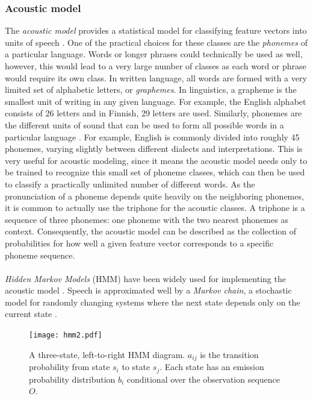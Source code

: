 \documentclass[english, 12pt, a4paper, pdftex, elec, utf8]{aaltothesis}
\begin{document}
\subsubsection{Acoustic model}

The \textit{acoustic model} provides a statistical model for classifying feature vectors into units of speech \cite{kallasjoki2016}. One of the practical choices for these classes are the \textit{phonemes} of a particular language. Words or longer phrases could technically be used as well, however, this would lead to a very large number of classes as each word or phrase would require its own class. In written language, all words are formed with a very limited set of alphabetic letters, or \textit{graphemes}. In linguistics, a grapheme is the smallest unit of writing in any given language. For example, the English alphabet consists of 26 letters and in Finnish, 29 letters are used. Similarly, phonemes are the different units of sound that can be used to form all possible words in a particular language \cite[p.~24--25]{huang2001spoken}. For example, English is commonly divided into roughly 45 phonemes, varying slightly between different dialects and interpretations. This is very useful for acoustic modeling, since it means the acoustic model needs only to be trained to recognize this small set of phoneme classes, which can then be used to classify a practically unlimited number of different words. As the pronunciation of a phoneme depends quite heavily on the neighboring phonemes, it is common to actually use the triphone for the acoustic classes. A triphone is a sequence of three phonemes: one phoneme with the two nearest phonemes as context. Consequently, the acoustic model can be described as the collection of probabilities for how well a given feature vector corresponds to a specific phoneme sequence. \\\\
\textit{Hidden Markov Models} (HMM) have been widely used for implementing the acoustic model \cite{gales2008application, hori2013speech}. Speech is approximated well by a \textit{Markov chain}, a stochastic model for randomly changing systems where the next state depends only on the current state \cite[p.~23--26]{yu2014automatic}. 
\begin{figure}[b]
	\centering
	\texttt{[image: hmm2.pdf]}
	\caption{A three-state, left-to-right HMM diagram. $a_{ij}$ is the transition probability from state $s_i$ to state $s_j$. Each state has an emission probability distribution $b_i$ conditional over the observation sequence $O$.}
	\label{fig:hmm} 
\end{figure}
\end{document}
